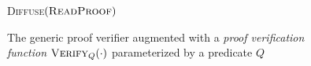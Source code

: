\begin{figure}[t]
\begin{algorithm}[H]
    \caption{\label{alg.generic-verifier} The generic proof verifier augmented
        with a{ \em proof verification function} $\textsc{Verify}_Q(\cdot)$
        parameterized by a predicate $Q$}
    \begin{algorithmic}[1]
        \Statex
            \If{$\Pi \neq \emptyset$}
            \EndIf
                \State\textsc{Diffuse}{$(\textsc{ReadProof})$}
            \EndIf
        \EndWhile
        \vskip8pt
    \end{algorithmic}
\end{algorithm}
\end{figure}
